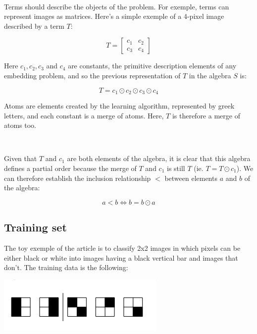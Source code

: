 \documentclass[a4paper, 11pt]{article}
\begin{document}
\

Terms should describe the objects of the problem. For exemple, terms can represent images as matrices. Here's a simple exemple of a 4-pixel image described by a term $T$:

\begin{equation*}
    T = \begin{bmatrix}
    c_1 & c_2 \\
    c_3 & c_4
    \end{bmatrix}
\end{equation*}

Here $c_1, c_2, c_3$ and $c_4$ are constants, the primitive description elements of any embedding problem, and so the previous representation of $T$ in the algebra $S$ is:

\begin{equation*}
    T = c_1 \odot c_2 \odot c_3 \odot c_4
\end{equation*}

Atoms are elements created by the learning algorithm, represented by greek letters, and each constant is a merge of atoms. Here, $T$ is therefore a merge of atoms too.

\

Given that $T$ and $c_1$ are both elements of the algebra, it is clear that this algebra defines a partial order because the merge of $T$ and $c_1$ is still $T$ (ie. $T = T \odot c_1$).  We can therefore establish the inclusion relationship $<$ between elements $a$ and $b$ of the algebra:

\begin{equation}
    a < b \Leftrightarrow b = b \odot a
\end{equation}

\subsection{Training set}

The toy exemple of the article is to classify 2x2 images in which pixels can be either black or white into images having a black vertical bar and images that don't. The training data is the following:

\begin{center}
    \includegraphics{training_data.png}
\end{center}
\end{document}
